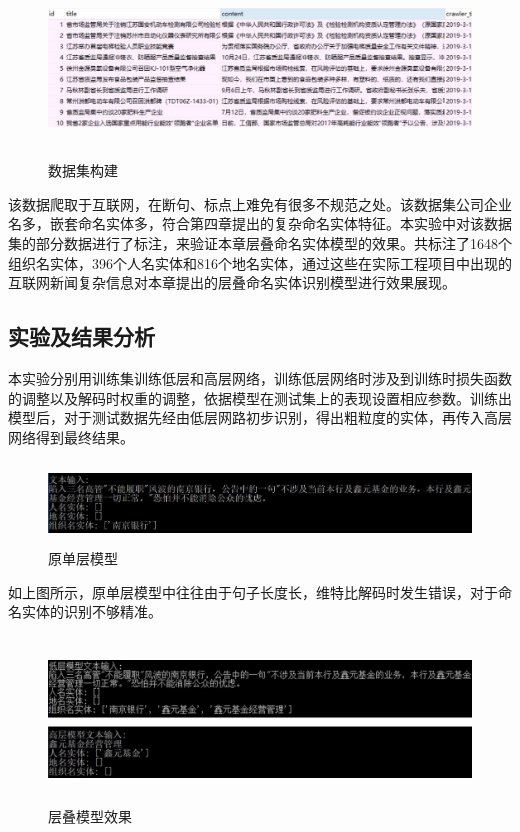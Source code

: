 \documentclass[winfonts,master,oneside,nobackinfo]{njuthesis}
\begin{document}
\begin{figure}[H]
\centering
\begin{minipage}[t]{\textwidth}
\includegraphics[width=1\textwidth,height=4.7cm]{./figure/数据集.jpg}
\caption{数据集构建}
\label{lab:1}
\end{minipage}
\end{figure}
该数据爬取于互联网，在断句、标点上难免有很多不规范之处。该数据集公司企业名多，嵌套命名实体多，符合第四章提出的复杂命名实体特征。本实验中对该数据集的部分数据进行了标注，来验证本章层叠命名实体模型的效果。共标注了1648个组织名实体，396个人名实体和816个地名实体，通过这些在实际工程项目中出现的互联网新闻复杂信息对本章提出的层叠命名实体识别模型进行效果展现。

\subsection{实验及结果分析}

本实验分别用训练集训练低层和高层网络，训练低层网络时涉及到训练时损失函数的调整以及解码时权重的调整，依据模型在测试集上的表现设置相应参数。训练出模型后，对于测试数据先经由低层网路初步识别，得出粗粒度的实体，再传入高层网络得到最终结果。

\begin{figure}[H]
\centering
\begin{minipage}[t]{\textwidth}
\includegraphics[width=1\textwidth,height=2.2cm]{./figure/原单层模型.jpg}
\caption{原单层模型}
\label{lab:1}
\end{minipage}
\end{figure}

如上图所示，原单层模型中往往由于句子长度长，维特比解码时发生错误，对于命名实体的识别不够精准。

\begin{figure}[H]
\centering
\begin{minipage}[t]{\textwidth}
\includegraphics[width=1\textwidth,height=4.4cm]{./figure/层叠模型效果.jpg}
\caption{层叠模型效果}
\label{lab:1}
\end{minipage}
\end{figure}
\end{document}
